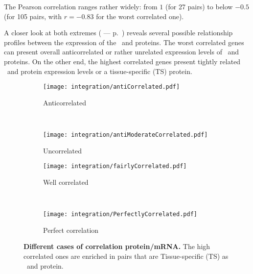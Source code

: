 The Pearson correlation ranges rather widely:
from $1$ (for 27 pairs)
to below $-0.5$ (for 105 pairs, with $r=-0.83$ for the worst correlated one).

A closer look at both extremes ( --- p.~\pageref{fig:caseGene})
reveals several possible relationship profiles
between the expression of the \mRNAs\ and proteins.
The worst correlated genes can present
overall anticorrelated or rather unrelated expression levels
of \mRNAs\ and proteins.
On the other end,
the highest correlated genes present
tightly related \mRNA\ and protein expression levels
or a tissue-specific (\gls{TS}) protein.

\begin{figure}[!htb]
    \begin{subfigure}[h]{0.5\textwidth}
        \centering \texttt{[image: integration/antiCorrelated.pdf]}
        \caption{Anticorrelated}\label{fig:caseAnticor}
    \end{subfigure}~%
    \begin{subfigure}[h]{0.5\textwidth}
        \centering \texttt{[image: integration/antiModerateCorrelated.pdf]}
        \caption{Uncorrelated}\label{fig:caseUncor}
    \end{subfigure}
    \vspace{2mm}

    \begin{subfigure}[h]{0.5\textwidth}
        \centering \texttt{[image: integration/fairlyCorrelated.pdf]}
        \caption{Well correlated}\label{fig:caseFairlyCor}
    \end{subfigure}~%
    \begin{subfigure}[h]{0.5\textwidth}
        \centering \texttt{[image: integration/PerfectlyCorrelated.pdf]}
        \caption{Perfect correlation}\label{fig:casePerfectlyCor}
    \end{subfigure}
    \caption[Different cases of correlation
    protein/mRNA]{\label{fig:caseGene}\textbf{Different cases of correlation
    protein/mRNA.} The high correlated ones are enriched in pairs that are
    Tissue-specific (TS) as \mRNA\ and protein.}
\end{figure}

